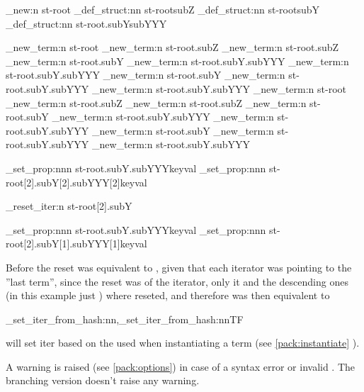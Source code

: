 \documentclass[10pt]{article}
\begin{document}
\begin{codestore}[store-env=demo7]
\starray_new:n {st-root}
\starray_def_struct:nn {st-root}{subZ}
\starray_def_struct:nn {st-root}{subY}
\starray_def_struct:nn {st-root.subY}{subYYY}

\starray_new_term:n {st-root}
\starray_new_term:n {st-root.subZ}
\starray_new_term:n {st-root.subZ}
\starray_new_term:n {st-root.subY}
\starray_new_term:n {st-root.subY.subYYY}
\starray_new_term:n {st-root.subY.subYYY}
\starray_new_term:n {st-root.subY}
\starray_new_term:n {st-root.subY.subYYY}
\starray_new_term:n {st-root.subY.subYYY}
\starray_new_term:n {st-root}
\starray_new_term:n {st-root.subZ}
\starray_new_term:n {st-root.subZ}
\starray_new_term:n {st-root.subY}
\starray_new_term:n {st-root.subY.subYYY}
\starray_new_term:n {st-root.subY.subYYY}
\starray_new_term:n {st-root.subY}
\starray_new_term:n {st-root.subY.subYYY}
\starray_new_term:n {st-root.subY.subYYY}

\starray_set_prop:nnn {st-root.subY.subYYY}{key}{val}
\starray_set_prop:nnn {st-root[2].subY[2].subYYY[2]}{key}{val}

\starray_reset_iter:n {st-root[2].subY}

\starray_set_prop:nnn {st-root.subY.subYYY}{key}{val}
\starray_set_prop:nnn {st-root[2].subY[1].subYYY[1]}{key}{val}
\end{codestore}


Before the reset  was equivalent to , given that each iterator was pointing to the ''last term'', since the reset was of the  iterator, only it and the descending ones (in this example just ) where reseted, and therefore  was then equivalent to 



\begin{codedescribe}[code,new=2023/11/04]{\starray_set_iter_from_hash:nn,\starray_set_iter_from_hash:nnTF}
\begin{codesyntax}%
\end{codesyntax}
 will set iter based on the  used when instantiating a term (see \ref{pack:instantiate} ).
\end{codedescribe}
\begin{tsremark}
A warning is raised (see \ref{pack:options}) in case of a  syntax error or invalid . The branching version doesn't raise any warning.
\end{tsremark}
\end{document}
